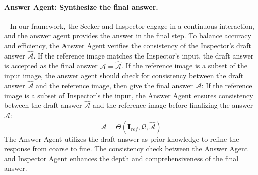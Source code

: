 \paragraph{Answer Agent: Synthesize the final answer.}~ In our framework, the Seeker and Inspector engage in a continuous interaction, and the answer agent provides the answer in the final step. To balance accuracy and efficiency, the Answer Agent verifies the consistency of the Inspector's draft answer $\hat{\mathcal{A}}$. If the reference image matches the Inspector's input, the draft answer is accepted as the final answer $\mathcal{A}=\hat{\mathcal{A}}$.
If the reference image is a subset of the input image, the answer agent should check for consistency between the draft answer $\hat{\mathcal{A}}$ and the reference image, then give the final answer $\mathcal{A}$: 
 If the reference image is a subset of Inspector's the input, the Answer Agent ensures consistency between the draft answer $\hat{\mathcal{A}}$ and the reference image before finalizing the answer $\mathcal{A}$:
\begin{equation}
\mathcal{A} = \Theta(\mathbf{I}_{ref}, \mathcal{Q}, \hat{\mathcal{A}})
\end{equation}
The Answer Agent utilizes the draft answer as prior knowledge to refine the response from coarse to fine. The consistency check between the Answer Agent and Inspector Agent enhances the depth and comprehensiveness of the final answer.